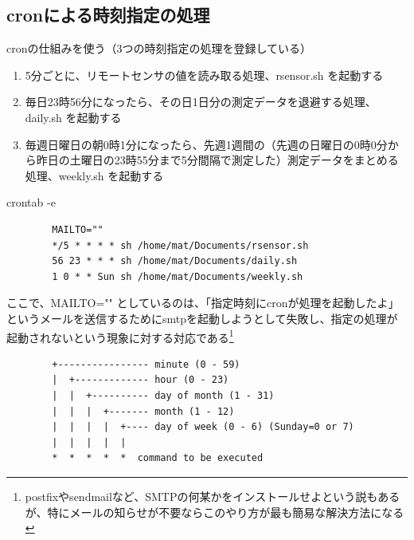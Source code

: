 \documentclass[12pt,a4paper,uplatex]{jsarticle}
\begin{document}

\newpage

\subsection{cronによる時刻指定の処理}

cronの仕組みを使う（3つの時刻指定の処理を登録している）
\begin{enumerate}
	\item[(1)] 5分ごとに、リモートセンサの値を読み取る処理、rsensor.sh を起動する
	\item[(2)] 毎日23時56分になったら、その日1日分の測定データを退避する処理、daily.sh を起動する
	\item[(3)] 毎週日曜日の朝0時1分になったら、先週1週間の（先週の日曜日の0時0分から昨日の土曜日の23時55分まで5分間隔で測定した）測定データをまとめる処理、weekly.sh を起動する
\end{enumerate}

\begin{itembox}[l]{crontab -e}
	\begin{verbatim}
		MAILTO=""
		*/5 * * * * sh /home/mat/Documents/rsensor.sh
		56 23 * * * sh /home/mat/Documents/daily.sh
		1 0 * * Sun sh /home/mat/Documents/weekly.sh
	\end{verbatim}
\end{itembox}

ここで、MAILTO="" としているのは、「指定時刻にcronが処理を起動したよ」というメールを送信するためにsmtpを起動しようとして失敗し、指定の処理が起動されないという現象に対する対応である\footnote{postfixやsendmailなど、SMTPの何某かをインストールせよという説もあるが、特にメールの知らせが不要ならこのやり方が最も簡易な解決方法になる}

\begin{screen}
	\begin{verbatim}
		+---------------- minute (0 - 59)
		|  +------------- hour (0 - 23)
		|  |  +---------- day of month (1 - 31)
		|  |  |  +------- month (1 - 12)
		|  |  |  |  +---- day of week (0 - 6) (Sunday=0 or 7)
		|  |  |  |  |
		*  *  *  *  *  command to be executed
	\end{verbatim}
\end{screen}

\end{document}
